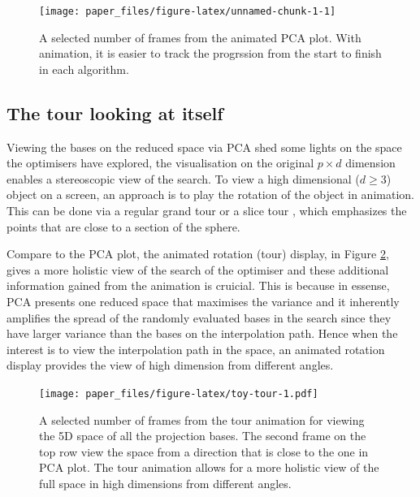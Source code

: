 \documentclass[12pt]{article}
\begin{document}
\begin{figure}

{\centering \texttt{[image: paper\_files/figure-latex/unnamed-chunk-1-1]} 

}

\caption{\label{toy-pca-aniamted}A selected number of frames from the animated PCA plot. With animation, it is easier to track the progrssion from the start to finish in each algorithm.}\label{fig:unnamed-chunk-1}
\end{figure}

\hypertarget{the-tour-looking-at-itself}{%
\subsection{The tour looking at itself}\label{the-tour-looking-at-itself}}

Viewing the bases on the reduced space via PCA shed some lights on the space the optimisers have explored, the visualisation on the original \(p \times d\) dimension enables a stereoscopic view of the search. To view a high dimensional (\(d \ge 3\)) object on a screen, an approach is to play the rotation of the object in animation. This can be done via a regular grand tour or a slice tour \citep{laa2020slice}, which emphasizes the points that are close to a section of the sphere.

Compare to the PCA plot, the animated rotation (tour) display, in Figure \ref{toy-tour}, gives a more holistic view of the search of the optimiser and these additional information gained from the animation is cruicial. This is because in essense, PCA presents one reduced space that maximises the variance and it inherently amplifies the spread of the randomly evaluated bases in the search since they have larger variance than the bases on the interpolation path. Hence when the interest is to view the interpolation path in the space, an animated rotation display provides the view of high dimension from different angles.

\begin{figure}
\centering
\texttt{[image: paper\_files/figure-latex/toy-tour-1.pdf]}
\caption{\label{fig:toy-tour}\label{toy-tour}A selected number of frames from the tour animation for viewing the 5D space of all the projection bases. The second frame on the top row view the space from a direction that is close to the one in PCA plot. The tour animation allows for a more holistic view of the full space in high dimensions from different angles.}
\end{figure}
\end{document}
